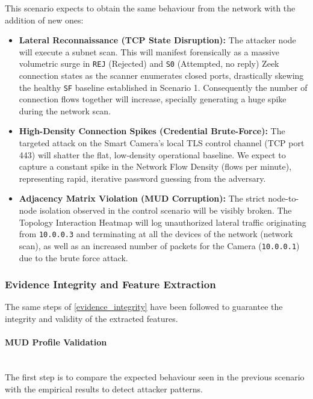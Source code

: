 This scenario expects to obtain the same behaviour from the network with the addition of new ones: 

\begin{itemize}
	\item \textbf{Lateral Reconnaissance (TCP State Disruption):} The attacker node will execute a subnet scan. This will manifest forensically as a massive volumetric surge in \texttt{REJ} (Rejected) and \texttt{S0} (Attempted, no reply) Zeek connection states as the scanner enumerates closed ports, drastically skewing the healthy \texttt{SF} baseline established in Scenario 1. Consequently the number of connection flows together will increase, specially generating a huge spike during the network scan. 
	
	\item \textbf{High-Density Connection Spikes (Credential Brute-Force):} The targeted attack on the Smart Camera's local TLS control channel (TCP port 443) will shatter the flat, low-density operational baseline. We expect to capture a constant spike in the Network Flow Density (flows per minute), representing rapid, iterative password guessing from the adversary.
	
	\item \textbf{Adjacency Matrix Violation (MUD Corruption):} The strict node-to-node isolation observed in the control scenario will be visibly broken. The Topology Interaction Heatmap will log unauthorized lateral traffic originating from \texttt{10.0.0.3} and terminating at all the devices of the network (network scan), as well as an increased number of packets for the Camera (\texttt{10.0.0.1}) due to the brute force attack.
\end{itemize}

\subsubsection{Evidence Integrity and Feature Extraction}
The same steps of \ref{evidence_integrity} have been followed to guarantee the integrity and validity of the extracted features. 

\paragraph{MUD Profile Validation}\mbox{}\\

The first step is to compare the expected behaviour seen in the previous scenario with the empirical results to detect attacker patterns.

